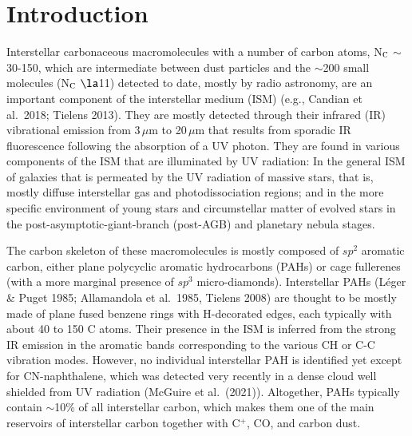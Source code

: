 \documentclass{aa}
\begin{document}
\maketitle 

\section{Introduction}
 
Interstellar carbonaceous macromolecules with a number of carbon atoms,  N$_{\rm C}$ $\sim$ 30-150,  which are intermediate between dust particles and  the  
$\sim$200 small molecules (N$_{\rm C}$ $\la$11) detected to date, mostly by radio astronomy, are an important component of the interstellar medium 
(ISM)  (e.g., Candian et al.\ 2018; Tielens 2013). They are mostly detected through their infrared (IR)  vibrational emission from 3\,$\mu$m to 20\,$\mu$m that results from sporadic IR fluorescence following the absorption 
of a UV photon. They are found in various components of the ISM 
 that are illuminated by UV radiation: In the general ISM of galaxies that is permeated by the UV radiation of massive stars, that is, mostly diffuse interstellar gas and photodissociation regions; and in the more specific environment of young stars and circumstellar matter of evolved stars in the post-asymptotic-giant-branch (post-AGB)
and planetary nebula stages. 

The carbon skeleton of these macromolecules is mostly composed of $sp^2$  
aromatic carbon, either plane polycyclic aromatic hydrocarbons (PAHs) or cage fullerenes (with a more marginal  presence of $sp^3$ micro-diamonds). Interstellar PAHs (L\'eger \& Puget 1985; Allamandola et al.\ 1985, Tielens 2008) are thought to be mostly made of plane fused benzene rings  with 
H-decorated edges, each typically with about 40 to 150 C atoms. Their presence in the ISM is inferred from the strong IR emission in the aromatic bands corresponding to the various CH or C-C vibration modes.  
However, no individual interstellar PAH is identified yet except for CN-naphthalene, which was detected very recently in a dense cloud well shielded from UV radiation (McGuire et al.\ (2021)).  Altogether, PAHs typically contain $\sim$10\% of 
all interstellar carbon, which makes them one of the main reservoirs of interstellar carbon together with C$^+$, CO, and carbon dust. 
\end{document}
